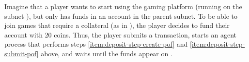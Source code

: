 \begin{example}
\label{ex:deposit}

Imagine that a player wants to start using the gaming platform (running on the subnet ), but only has funds in an account  in the parent subnet.
To be able to join games that require a collateral (as in ), the player decides to fund their account  with 20 coins.
Thus, the player submits a  transaction, starts an \ipc agent process that performs steps \ref{item:deposit-step-create-pof} and \ref{item:deposit-step-submit-pof} above,
and waits until the funds appear on .

\end{example}



 



